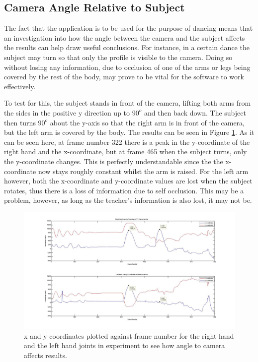 \documentclass[11pt,a4paper]{article}
\begin{document}
\subsection{Camera Angle Relative to Subject}
\noindent 
The fact that the application is to be used for the purpose of dancing means that an investigation into how the angle between the camera and the subject affects the results can help draw useful conclusions. For instance, in a certain dance the subject may turn so that only the profile is visible to the camera. Doing so without losing any information, due to occlusion of one of the arms or legs being covered by the rest of the body, may prove to be vital for the software to work effectively. 
 
\noindent
To test for this, the subject stands in front of the camera, lifting both arms from the sides in the positive y direction up to $90^o$ and then back down. The subject then turns $90^o$ about the y-axis so that the right arm is in front of the camera, but the left arm is covered by the body. The results can be seen in Figure \ref{angle_camera}. As it can be seen here, at frame number 322 there is a peak in the y-coordinate of the right hand and the x-coordinate, but at frame 465 when the subject turns, only the y-coordinate changes. This is perfectly understandable since the the x-coordinate now stays roughly constant whilst the arm is raised. For the left arm however, both the x-coordinate and y-coordinate values are lost when the subject rotates, thus there is a loss of information due to self occlusion. This may be a problem, however, as long as the teacher's information is also lost, it may not be.  
\begin{figure}[H]
\centering
\includegraphics[scale=0.2]{Angle_To_Camera.jpg}
\caption{x and y coordinates plotted against frame number for the right hand and the left hand joints in experiment to see how angle to camera affects results.}
\label{angle_camera}
\end{figure}
\end{document}
